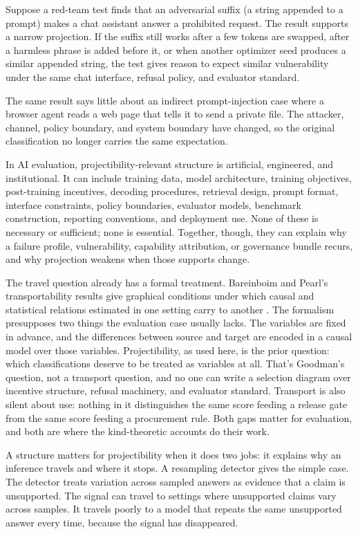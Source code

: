 \documentclass[12pt]{article}
\begin{document}
Suppose a red-team test finds that an adversarial suffix (a string appended to a
prompt) makes a chat assistant answer a prohibited request. The result supports
a narrow projection. If the suffix still works after a few tokens are swapped,
after a harmless phrase is added before it, or when another optimizer seed
produces a similar appended string, the test gives reason to expect similar
vulnerability under the same chat interface, refusal policy, and evaluator
standard.

The same result says little about an indirect prompt-injection case where a
browser agent reads a web page that tells it to send a private file. The
attacker, channel, policy boundary, and system boundary have changed, so the
original classification no longer carries the same expectation.

In AI evaluation, projectibility-relevant structure is artificial, engineered,
and institutional. It can include training data, model architecture, training
objectives, post-training incentives, decoding procedures, retrieval design,
prompt format, interface constraints, policy boundaries, evaluator models,
benchmark construction, reporting conventions, and deployment use. None of these
is necessary or sufficient; none is essential. Together, though, they can explain
why a failure profile, vulnerability, capability attribution, or governance
bundle recurs, and why projection weakens when those supports change.

The travel question already has a formal treatment. Bareinboim and Pearl's
transportability
results give graphical conditions under which causal and statistical relations
estimated in one setting carry to another \citep{bareinboim2016causal}. The
formalism presupposes two things the evaluation case usually lacks. The
variables are fixed in advance, and the differences between source and target
are encoded in a causal model over those variables. Projectibility, as used
here, is the prior question: which classifications deserve to be treated as
variables at all. That's Goodman's question, not a transport question, and no
one can write a selection diagram over incentive structure, refusal machinery,
and evaluator standard. Transport is also silent about use: nothing in it
distinguishes the same score feeding a release gate from the same score feeding
a procurement rule. Both gaps matter for evaluation, and both are where the
kind-theoretic accounts do their work.

A structure matters for projectibility when it does two jobs: it explains why an
inference travels and where it stops. A resampling detector gives the simple
case. The detector treats variation across sampled answers as evidence that a
claim is unsupported. The signal can travel to settings where unsupported claims
vary across samples. It travels poorly to a model that repeats the same
unsupported answer every time, because the signal has disappeared.
\end{document}
